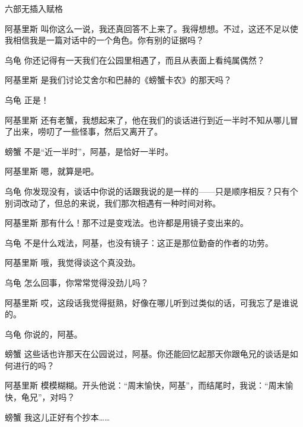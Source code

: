 \begin{dialog}{六部无插入赋格}
\begin{dialogue}
\item[阿基里斯]叫你这么一说，我还真回答不上来了。我得想想。不过，这还不足以使我相信我是一篇对话中的一个角色。你有别的证据吗？

\item[乌龟]你还记得有一天我们在公园里相遇了，而且从表面上看纯属偶然？

\item[阿基里斯]是我们讨论艾舍尔和巴赫的《螃蟹卡农》的那天吗？

\item[乌龟]正是！

\item[阿基里斯]还有老蟹，我想起来了，他在我们的谈话进行到近一半时不知从哪儿冒了出来，唠叨了一些怪事，然后又离开了。

\item[螃蟹]不是“近一半时”，阿基，是恰好一半时。

\item[阿基里斯]嗯，就算是吧。

\item[乌龟]你发现没有，谈话中你说的话跟我说的是一样的——只是顺序相反？只有个别词改动了，但总的来说，我们那次相遇有一种时间对称。

\item[阿基里斯]那有什么！那不过是变戏法。也许都是用镜子变出来的。

\item[乌龟]不是什么戏法，阿基，也没有镜子：这正是那位勤奋的作者的功劳。

\item[阿基里斯]哦，我觉得谈这个真没劲。

\item[乌龟]怎么回事，你常常觉得没劲儿吗？

\item[阿基里斯]哎，这段话我觉得挺熟，好像在哪儿听到过类似的话，可我忘了是谁说的。

\item[乌龟]你说的，阿基。

\item[螃蟹]这些话也许那天在公园说过，阿基。你还能回忆起那天你跟龟兄的谈话是如何进行的吗？

\item[阿基里斯]模模糊糊。开头他说：“周末愉快，阿基”，而结尾时，我说：“周末愉快，龟兄”，对吗？

\item[螃蟹]我这儿正好有个抄本……



\end{dialogue}
\end{dialog}
